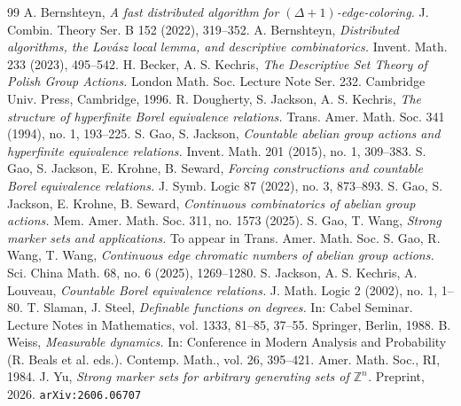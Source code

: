 \documentclass[10pt,a4paper]{amsart}
\newcommand{\Z}{\mathbb Z}
\begin{document}
\begin{thebibliography}{99}
 A. Bernshteyn, \textit{A fast distributed algorithm for $(\Delta+1)$-edge-coloring.} J. Combin. Theory Ser. B 152 (2022), 319--352.
 A. Bernshteyn, \textit{Distributed algorithms, the Lov\'{a}sz local lemma, and descriptive combinatorics.} Invent. Math. 233 (2023), 495--542.
 H. Becker, A. S. Kechris, \textit{The Descriptive Set Theory of Polish Group Actions.} London Math. Soc. Lecture Note Ser. 232. Cambridge Univ. Press, Cambridge, 1996.
 R. Dougherty, S. Jackson, A. S. Kechris, \textit{The structure of hyperfinite Borel equivalence relations.} Trans. Amer. Math. Soc. 341 (1994), no. 1, 193--225.
 S. Gao, S. Jackson, \textit{Countable abelian group actions and hyperfinite equivalence relations.} Invent. Math. 201 (2015), no. 1, 309--383.
 S. Gao, S. Jackson, E. Krohne, B. Seward, \textit{Forcing constructions and countable Borel equivalence relations.} J. Symb. Logic 87 (2022), no. 3, 873--893.
 S. Gao, S. Jackson, E. Krohne, B. Seward, \textit{Continuous combinatorics of abelian group actions.} Mem. Amer. Math. Soc. 311, no. 1573 (2025).
 S. Gao, T. Wang, \textit{Strong marker sets and applications.} To appear in Trans. Amer. Math. Soc.
 S. Gao, R. Wang, T. Wang, \textit{Continuous edge chromatic numbers of abelian group actions.} Sci. China Math. 68, no. 6 (2025), 1269–1280.
 S. Jackson, A. S. Kechris, A. Louveau, \textit{Countable Borel equivalence relations.} J. Math. Logic 2 (2002), no. 1, 1--80.
 T. Slaman, J. Steel, \textit{Definable functions on degrees.} In: Cabel Seminar. Lecture Notes in Mathematics, vol. 1333, 81--85, 37--55. Springer, Berlin, 1988.
 B. Weiss, \textit{Measurable dynamics.} In: Conference in Modern Analysis and Probability (R. Beals et al. eds.). Contemp. Math., vol. 26, 395--421. Amer. Math. Soc., RI, 1984.
 J. Yu, \textit{Strong marker sets for arbitrary generating sets of $\Z^n$.} Preprint, 2026. {\tt arXiv:2606.06707}
\end{thebibliography}
\end{document}
